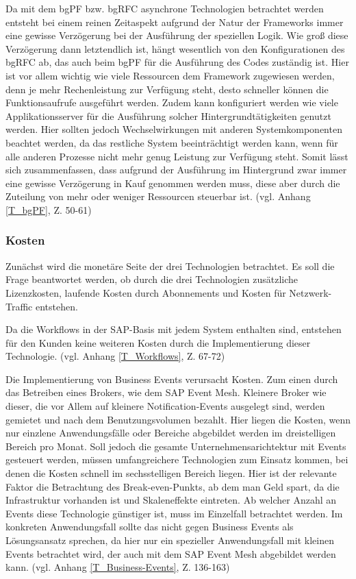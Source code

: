 Da mit dem bgPF bzw. bgRFC asynchrone Technologien betrachtet werden entsteht bei einem reinen Zeitaspekt aufgrund der Natur der Frameworks immer eine gewisse Verzögerung bei der Ausführung der speziellen Logik. Wie gro{\ss} diese Verzögerung dann letztendlich ist, hängt wesentlich von den Konfigurationen des bgRFC ab, das auch beim bgPF für die Ausführung des Codes zuständig ist. Hier ist vor allem wichtig wie viele Ressourcen dem Framework zugewiesen werden, denn je mehr Rechenleistung zur Verfügung steht, desto schneller können die Funktionsaufrufe ausgeführt werden. Zudem kann konfiguriert werden wie viele Applikationsserver für die Ausführung solcher Hintergrundtätigkeiten genutzt werden. Hier sollten jedoch Wechselwirkungen mit anderen Systemkomponenten beachtet werden, da das restliche System beeinträchtigt werden kann, wenn für alle anderen Prozesse nicht mehr genug Leistung zur Verfügung steht. Somit lässt sich zusammenfassen, dass aufgrund der Ausführung im Hintergrund zwar immer eine gewisse Verzögerung in Kauf genommen werden muss, diese aber durch die Zuteilung von mehr oder weniger Ressourcen steuerbar ist. (vgl. Anhang \ref{T_bgPF}, Z. 50-61)

\subsubsection{Kosten}

Zunächst wird die monetäre Seite der drei Technologien betrachtet. Es soll die Frage beantwortet werden, ob durch die drei Technologien zusätzliche Lizenzkosten, laufende Kosten durch Abonnements und Kosten für Netzwerk-Traffic entstehen. 

Da die Workflows in der SAP-Basis mit jedem System enthalten sind, entstehen für den Kunden keine weiteren Kosten durch die Implementierung dieser Technologie. (vgl. Anhang \ref{T_Workflows}, Z. 67-72)

Die Implementierung von Business Events verursacht Kosten. Zum einen durch das Betreiben eines Brokers, wie \zB dem SAP Event Mesh. Kleinere Broker wie dieser, die vor Allem auf kleinere Notification-Events ausgelegt sind, werden gemietet und nach dem Benutzungsvolumen bezahlt. Hier liegen die Kosten, wenn nur einzlene Anwendungsfälle oder Bereiche abgebildet werden im dreistelligen Bereich pro Monat. Soll jedoch die gesamte Unternehmensarichtektur mit Events gesteuert werden, müssen umfangreichere Technologien zum Einsatz kommen, bei denen die Kosten schnell im sechsstelligen Bereich liegen. Hier ist der relevante Faktor die Betrachtung des Break-even-Punkts, ab dem man Geld spart, da die Infrastruktur vorhanden ist und Skaleneffekte eintreten. Ab welcher Anzahl an Events diese Technologie günstiger ist, muss im Einzelfall betrachtet werden. Im konkreten Anwendungsfall sollte das nicht gegen Business Events als Lösungsansatz sprechen, da hier nur ein spezieller Anwendungsfall mit kleinen Events betrachtet wird, der auch mit dem SAP Event Mesh abgebildet werden kann. (vgl. Anhang \ref{T_Business-Events}, Z. 136-163)

